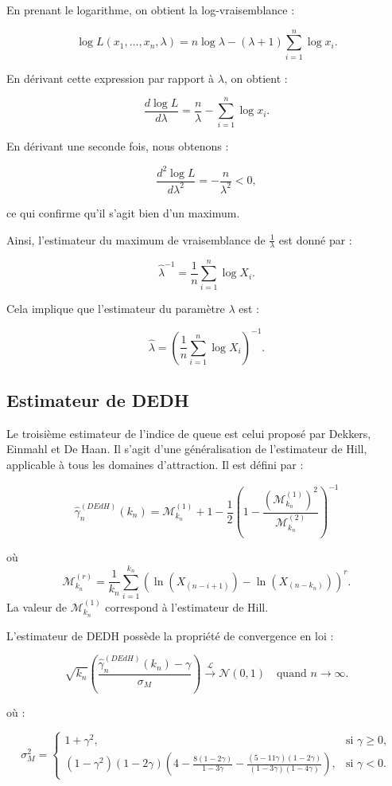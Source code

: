 \documentclass{article}
\begin{document}
En prenant le logarithme, on obtient la log-vraisemblance :

\[
\log L(x_1, \dots, x_n, \lambda) = n \log \lambda - (\lambda + 1) \sum_{i=1}^{n} \log x_i.
\]

En dérivant cette expression par rapport à \( \lambda \), on obtient :

\[
\frac{d \log L}{d \lambda} = \frac{n}{\lambda} - \sum_{i=1}^{n} \log x_i.
\]

En dérivant une seconde fois, nous obtenons :

\[
\frac{d^2 \log L}{d \lambda^2} = -\frac{n}{\lambda^2} < 0,
\]

ce qui confirme qu'il s'agit bien d'un maximum.  

Ainsi, l'estimateur du maximum de vraisemblance de \( \frac{1}{\lambda} \) est donné par :

\[
\hat{\lambda}^{-1} = \frac{1}{n} \sum_{i=1}^{n} \log X_i.
\]

Cela implique que l'estimateur du paramètre \( \lambda \) est :

\[
\hat{\lambda} = \left( \frac{1}{n} \sum_{i=1}^{n} \log X_i \right)^{-1}.
\]

\subsection{Estimateur de DEDH}
Le troisième estimateur de l'indice de queue est celui proposé par Dekkers, Einmahl et De Haan. Il s'agit d'une généralisation de l'estimateur de Hill, applicable à tous les domaines d'attraction. Il est défini par :

\[
\hat{\gamma}_n^{(DEdH)}(k_n) = \mathcal{M}^{(1)}_{k_n} + 1 - \frac{1}{2} \left( 1 - \frac{(\mathcal{M}^{(1)}_{k_n})^2}{\mathcal{M}^{(2)}_{k_n}} \right)^{-1}
\]

où 
\[
\mathcal{M}^{(r)}_{k_n} = \frac{1}{k_n} \sum_{i=1}^{k_n} (\ln(X_{(n-i+1)}) - \ln(X_{(n-k_n)}))^r.
\]
La valeur de \(\mathcal{M}^{(1)}_{k_n}\) correspond à l'estimateur de Hill.

L'estimateur de DEDH possède la propriété de convergence en loi :

\[
\sqrt{k_n}(\frac{\hat{\gamma}_n^{(DEdH)}(k_n) - \gamma}{\sigma_M}) \xrightarrow{\mathcal{L}} \mathcal{N}(0,1) \quad \text{quand } n \to \infty.
\]

où :

\[
\sigma_M^2 = 
\begin{cases} 
1 + \gamma^2, & \text{si } \gamma \geq 0, \\ 
(1 - \gamma^2)(1 - 2\gamma)
\left( 4 - \frac{8 (1 - 2\gamma)}{1 - 3\gamma} - \frac{(5 - 11\gamma)(1 - 2\gamma)}{(1 - 3\gamma)(1 - 4\gamma)} \right), 
& \text{si } \gamma < 0.
\end{cases}
\]
\end{document}

